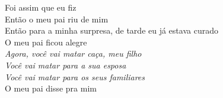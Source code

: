 \bigskip

\begin{linenumbers}\begingroup\raggedright
 
\noindent   Foi assim que eu fiz\\
  Então o meu pai riu de mim\\
  Então para a minha surpresa, de tarde eu já estava curado\\
  O meu pai ficou alegre\\
  \emph{Agora, você vai matar caça, meu filho}\\
  \emph{Você vai matar para a sua esposa}\\
  \emph{Você vai matar para os seus familiares}\\
  O meu pai disse pra mim
 
\end{linenumbers}\endgroup

\bigskip

